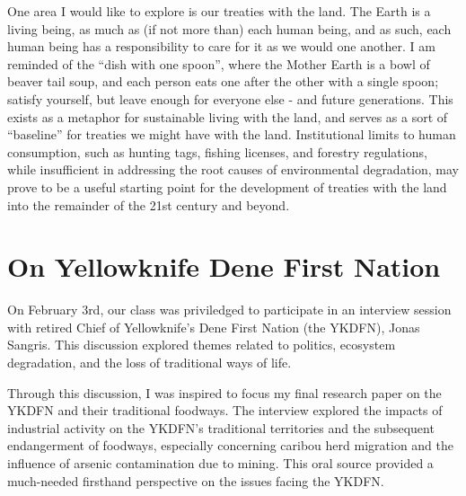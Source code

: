 \documentclass{report}
\begin{document}


\hspace{24pt} One area I would like to explore is our treaties with the land. The Earth is a living being, as much as (if not more than) each human being, and as such, each human being has a responsibility to care for it as we would one another. I am reminded of the ``dish with one spoon'', where the Mother Earth is a bowl of beaver tail soup, and each person eats one after the other with a single spoon; satisfy yourself, but leave enough for everyone else - and future generations. This exists as a metaphor for sustainable living with the land, and serves as a sort of ``baseline'' for treaties we might have with the land. Institutional limits to human consumption, such as hunting tags, fishing licenses, and forestry regulations, while insufficient in addressing the root causes of environmental degradation, may prove to be a useful starting point for the development of treaties with the land into the remainder of the 21st century and beyond.



\section{On Yellowknife Dene First Nation}

\hspace{24pt} On February 3rd, our class was priviledged to participate in an interview session with retired Chief of Yellowknife's Dene First Nation (the YKDFN), Jonas Sangris. This discussion explored themes related to politics, ecosystem degradation, and the loss of traditional ways of life.

\hspace{24pt} Through this discussion, I was inspired to focus my final research paper on the YKDFN and their traditional foodways. The interview explored the impacts of industrial activity on the YKDFN's traditional territories and the subsequent endangerment of foodways, especially concerning caribou herd migration and the influence of arsenic contamination due to mining. This oral source provided a much-needed firsthand perspective on the issues facing the YKDFN.
\end{document}
